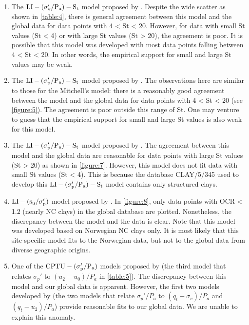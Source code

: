 \begin{paracol}{2}
\begin{enumerate}
        \item The $\rm{LI}-(\sigma_v'/P_a)-S_t$ model proposed by \citet{Mitchell1993}. Despite the wide scatter as shown in \autoref{table:4}, there is general agreement between this model and the global data for data points with 4 < St < 20. However, for data with small St values (St < 4) or with large St values (St > 20), the agreement is poor. It is possible that this model was developed with most data points falling between 4 < St < 20. In other words, the empirical support for small and large St values may be weak.
        
        \item The $\rm{LI}-(\sigma_p'/P_a)-S_t$ model proposed by \citet{NAVFAC1982}. The observations here are similar to those for the Mitchell’s model: there is a reasonably good agreement between the model and the global data for data points with 4 < St < 20 (see \autoref{figure:5}). The agreement is poor outside this range of St. One may venture to guess that the empirical support for small and large St values is also weak for this model.
        
        \item The $\rm{LI}-(\sigma_p'/P_a)-S_t$ model proposed by \citet{Ching2012522}. The agreement between this model and the global data are reasonable for data points with large St values (St > 20) as shown in \autoref{figure:7}. However, this model does not fit data with small St values (St < 4). This is because the database CLAY/5/345 used to develop this $\rm{LI}-(\sigma_p'/P_a)-S_t$ model contains only structured clays.
        
        \item $\rm{LI}-(s_u/\sigma_p')$ model proposed by \citet{Bjerrum1960711}. In \autoref{figure:8}, only data points with OCR < 1.2 (nearly NC clays) in the global database are plotted. Nonetheless, the discrepancy between the model and the data is clear. Note that this model was developed based on Norwegian NC clays only. It is most likely that this site-specific model fits to the Norwegian data, but not to the global data from diverse geographic origins.
        
        \item One of the $\rm{CPTU}-(\sigma_p'/P_a)$ models proposed by \citet{Chen1996488} (the third model that relates $\sigma_p'$ to $(u_2-u_0)/P_a$ in \autoref{table:5}). The discrepancy between this model and our global data is apparent. However, the first two models developed by \citet{Chen1996488} (the two models that relate $\sigma_p'/P_a$ to $(q_t-\sigma_v)/P_a$ and $(q_t-u_2)/P_a$) provide reasonable fits to our global data. We are unable to explain this anomaly.
    \end{enumerate}


\end{paracol}
